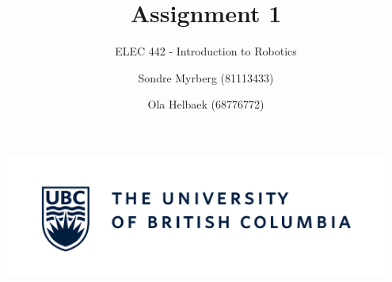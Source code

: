 \documentclass[a4paper]{scrartcl}
\title{Assignment 1}
\subtitle{ELEC 442 - Introduction to Robotics}
\author{Sondre Myrberg (81113433) \and Ola Helbaek (68776772)}
\begin{document}
\hypersetup{pageanchor=false}
\begin{titlepage}
    \maketitle
    \vfill
    \vfill
    \vfill
    \vfill
    \includegraphics[width=0.95\textwidth]{../../ubc_logo.pdf}
    \vfill
    \vfill
\end{titlepage}
\hypersetup{pageanchor=true}

\section{}  
\end{document}
